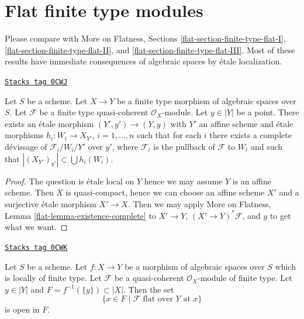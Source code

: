 \section{Flat finite type modules}
\label{spaces-flat-section-finite-type-flat}
Please compare with
More on Flatness, Sections
\ref{flat-section-finite-type-flat-I},
\ref{flat-section-finite-type-flat-II}, and
\ref{flat-section-finite-type-flat-III}.
Most of these results have immediate consequences
of algebraic spaces by \'etale localization.

\begin{lemma}
\label{spaces-flat-lemma-existence-complete}
\href{https://stacks.math.columbia.edu/tag/0CWJ}{\texttt{Stacks tag 0CWJ}}

Let $S$ be a scheme.
Let $X \to Y$ be a finite type morphism of algebraic spaces over $S$.
Let $\mathcal{F}$ be a finite type quasi-coherent $\mathcal{O}_X$-module.
Let $y \in |Y|$ be a point. There exists an \'etale morphism
$(Y', y') \to (Y, y)$ with $Y'$ an affine scheme and \'etale morphisms
$h_i : W_i \to X_{Y'}$, $i = 1, \ldots, n$ such that for each
$i$ there exists a complete d\'evissage of $\mathcal{F}_i/W_i/Y'$ over $y'$,
where $\mathcal{F}_i$ is the pullback of $\mathcal{F}$ to $W_i$
and such that $|(X_{Y'})_{y'}| \subset \bigcup h_i(W_i)$.
\end{lemma}

\begin{proof}
The question is \'etale local on $Y$ hence we may assume $Y$
is an affine scheme. Then $X$ is quasi-compact, hence we can
choose an affine scheme $X'$ and a surjective \'etale morphism
$X' \to X$. Then we may apply
More on Flatness, Lemma \ref{flat-lemma-existence-complete}
to $X' \to Y$, $(X' \to Y)^*\mathcal{F}$, and $y$ to
get what we want.
\end{proof}

\begin{lemma}
\label{spaces-flat-lemma-open-in-fibre-where-flat}
\href{https://stacks.math.columbia.edu/tag/0CWK}{\texttt{Stacks tag 0CWK}}

Let $S$ be a scheme.
Let $f : X \to Y$ be a morphism of algebraic spaces over $S$
which is locally of finite type.
Let $\mathcal{F}$ be a quasi-coherent $\mathcal{O}_X$-module of finite type.
Let $y \in |Y|$ and $F = f^{-1}(\{y\}) \subset |X|$. Then the set
$$
\{x \in F \mid \mathcal{F} \text{ flat over }Y\text{ at }x\}
$$
is open in $F$.
\end{lemma}

